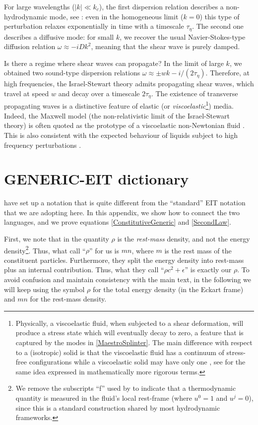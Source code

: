 \documentclass[a4paper, amsfonts, amssymb, amsmath, reprint, showkeys, nofootinbib, twoside, onecolumn, notitlepage]{revtex4-1}
\theoremstyle{definition}
\theoremstyle{theorem}
\begin{document}
For large wavelengths ($|k|\ll k_c$), the first dispersion relation describes a non-hydrodynamic mode, see \cite{GavassinoQuasi2022}: even in the homogeneous limit ($k=0$) this type of perturbation relaxes exponentially in time with a timescale $\tau_\eta$. 
The second one describes a diffusive mode: for small $k$, we recover the usual Navier-Stokes-type diffusion relation $\omega \approx -iDk^2$, meaning that the shear wave is purely damped. 

Is there a regime where shear waves can propagate? In the limit of large $k$, we obtained two sound-type dispersion relations $\omega \approx \pm w k -i/(2\tau_\eta)$. Therefore, at high frequencies, the Israel-Stewart theory admits propagating shear waves, which travel at speed $w$ and decay over a timescale $2\tau_\eta$. The existence of transverse propagating waves is a distinctive feature of elastic 
(or \emph{viscoelastic}\footnote{
    Physically, a viscoelastic fluid, when subjected to a shear deformation, will produce a stress state which will eventually decay to zero, a feature that is captured by the modes in \eqref{MaestroSplinter}. The main difference with respect to a (isotropic) solid is that the viscoelastic fluid has a continuum of stress-free configurations while a viscoelastic solid may have only one \citep{CHRISTENSEN19821}, see \cite{Truesdell1965} for the same idea expressed in mathematically more rigorous terms.}) 
media. Indeed, the Maxwell model (the non-relativistic limit of the Israel-Stewart theory) is often quoted as the prototype of a viscoelastic non-Newtonian fluid \cite{CHRISTENSEN19821,Tropea_book,Li2011}. This is also consistent with the expected behaviour of liquids subject to high frequency perturbations \citep{Frenkel_book}. 


\section{GENERIC-EIT dictionary}
\label{AAA}

\citet{Stricker2019} have set up a notation that is quite different from the ``standard'' EIT notation that we are adopting here. In this appendix, we show how to connect the two languages, and we prove equations \eqref{ConstitutiveGeneric} and \eqref{SecondLaw}.

First, we note that in \cite{Stricker2019} the quantity $\rho$ is the \textit{rest-mass} density, and not the energy density\footnote{
    We remove the subscripts ``f'' used by \citet{Stricker2019} to indicate that a thermodynamic quantity is measured in the fluid's local rest-frame (where $u^0=1$ and $u^j=0$), since this is a standard construction shared by most hydrodynamic frameworks. 
    }. 
Thus, what  \citet{Stricker2019} call ``$\rho$'' for us is $mn$, where $m$ is the rest mass of the constituent particles. Furthermore, they split the energy density into rest-mass plus an internal contribution. Thus, what they call ``$\rho c^2 + \epsilon$'' is exactly our $\rho$. 
To avoid confusion and maintain consistency with the main text, in the following we will keep using the symbol $\rho$ for the total energy density (in the Eckart frame) and $mn$ for the rest-mass density.
\end{document}

